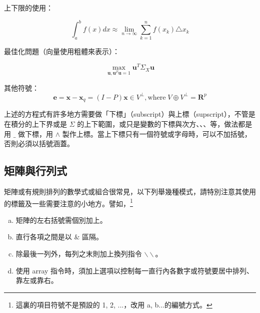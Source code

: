   
  上下限的使用：
  
  $$\int_a^b f(x) dx \approx \lim_{n\rightarrow \infty}\sum_{k=1}^n f(x_k)\triangle x_k$$
  
  最佳化問題（向量使用粗體來表示）：
  
  $$\max_{\mathbf{u},\mathbf{u}^T\mathbf{u}=1} \mathbf{u}^T\Sigma_X\mathbf{u}$$
  
  其他符號：
  $$\mathbf{e}=\mathbf{x}-\mathbf{x}_q=(I-P)\mathbf{x} \in V^{\perp}, \mbox{where}\; V\oplus V^{\perp}=\mathbf{R}^p $$

 上述的方程式有許多地方需要做「下標」（subscript）與上標（supscript），不管是在積分的上下界或是 $\Sigma$ 的上下範圍，或只是變數的下標與次方、、、等，做法都是用  $\_$ 做下標，用 $\wedge$ 製作上標。當上下標只有一個符號或字母時，可以不加括號，否則必須以括號涵蓋。
 
\subsection{矩陣與行列式}
矩陣或有規則排列的數學式或組合很常見，以下列舉幾種模式，請特別注意其使用的標籤及一些需要注意的小地方。譬如，\footnote{這裏的項目符號不是預設的 1, 2, ...，改用 a, b...的編號方式。}
\begin{enumerate}[a)]
  \item 矩陣的左右括號需個別加上。
  \item 直行各項之間是以 $\&$ 區隔。
  \item 除最後一列外，每列之末則加上換列指令 $\backslash\backslash$。
  \item 使用 {\A array} 指令時，須加上選項以控制每一直行內各數字或符號要居中排列、靠左或靠右。
\end{enumerate}

